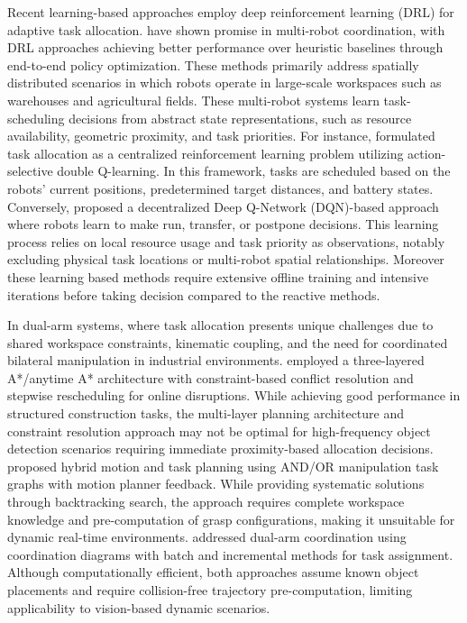\documentclass[pdflatex,sn-mathphys-num]{sn-jnl}%
\theoremstyle{thmstyleone}%
\theoremstyle{thmstylethree}%
\begin{document}
Recent learning-based approaches employ deep reinforcement learning (DRL) for adaptive task allocation. \cite{ma2024end, lu2024reinforcement} have shown promise in multi-robot coordination, with DRL approaches achieving better performance over heuristic baselines through end-to-end policy optimization. These methods primarily address spatially distributed scenarios in which robots operate in large-scale workspaces such as warehouses and agricultural fields. These multi-robot systems learn task-scheduling decisions from abstract state representations, such as resource availability, geometric proximity, and task priorities. For instance, \cite{huang2025reinforcement} formulated task allocation as a centralized reinforcement learning problem utilizing action-selective double Q-learning. In this framework, tasks are scheduled based on the robots' current positions, predetermined target distances, and battery states. Conversely, \cite{gautier2020comparison} proposed a decentralized Deep Q-Network (DQN)-based approach where robots learn to make run, transfer, or postpone decisions. This learning process relies on local resource usage and task priority as observations, notably excluding physical task locations or multi-robot spatial relationships. Moreover these learning based methods require extensive offline training and intensive iterations before taking decision compared to the reactive methods.

In dual-arm systems, where task allocation presents unique challenges due to shared workspace constraints, kinematic coupling, and the need for coordinated bilateral manipulation in industrial environments. \cite{intro_7} employed a three-layered A*/anytime A* architecture with constraint-based conflict resolution and stepwise rescheduling for online disruptions. While achieving good performance in structured construction tasks, the multi-layer planning architecture and constraint resolution approach may not be optimal for high-frequency object detection scenarios requiring immediate proximity-based allocation decisions. \cite{intro_9} proposed hybrid motion and task planning using AND/OR manipulation task graphs with motion planner feedback. While providing systematic solutions through backtracking search, the approach requires complete workspace knowledge and pre-computation of grasp configurations, making it unsuitable for dynamic real-time environments. \cite{intro_10} addressed dual-arm coordination using coordination diagrams with batch and incremental methods for task assignment. Although computationally efficient, both approaches assume known object placements and require collision-free trajectory pre-computation, limiting applicability to vision-based dynamic scenarios.
\end{document}
